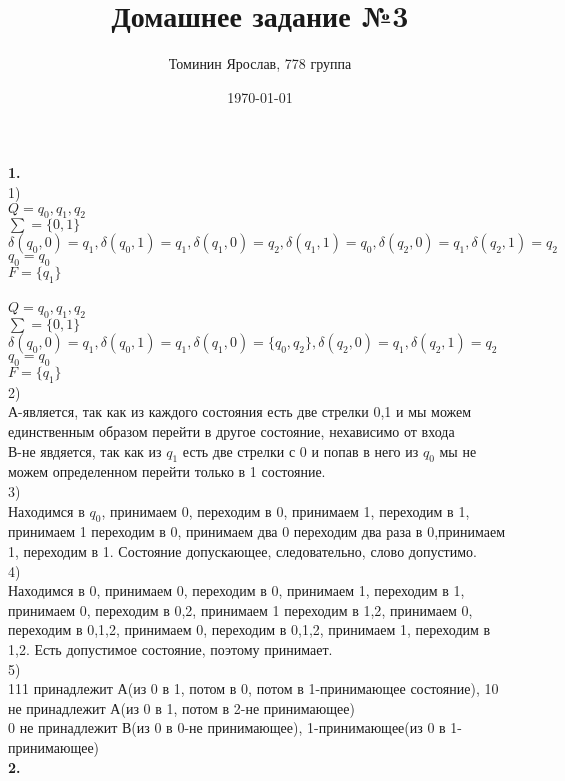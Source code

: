 \documentclass[a4paper,12pt]{article}
\author{Томинин Ярослав, 778 группа}
\title{Домашнее задание №3}
\date{\today}
\begin{document}
 

\maketitle
\newpage
\textbf{1.}\\
1)\\
$Q=q_0,q_1,q_2$\\
$\sum=\lbrace 0,1\rbrace$\\
$\delta(q_0,0)=q_1,\delta(q_0,1)=q_1,\delta(q_1,0)=q_2,\delta(q_1,1)=q_0,\delta(q_2,0)=q_1,\delta(q_2,1)=q_2$\\
$q_0=q_0$\\
$F=\lbrace q_1 \rbrace$\\
\\
$Q=q_0,q_1,q_2$\\
$\sum=\lbrace 0,1\rbrace$\\
$\delta(q_0,0)=q_1,\delta(q_0,1)=q_1,\delta(q_1,0)=\lbrace q_0,q_2 \rbrace ,\delta(q_2,0)=q_1,\delta(q_2,1)=q_2$\\
$q_0=q_0$\\
$F=\lbrace q_1 \rbrace$\\
2)\\
А-является, так как из каждого состояния есть две стрелки 0,1 и мы можем единственным образом перейти в другое состояние, нехависимо от входа\\
В-не явдяется, так как из $q_1$ есть две стрелки с 0 и попав в него из $q_0$ мы не можем определенном перейти только в 1 состояние.\\
3)\\
Находимся в $q_0$, принимаем 0, переходим в 0, принимаем 1, переходим в 1, принимаем 1 переходим в 0, принимаем два 0 переходим два раза в 0,принимаем 1, переходим в 1. Состояние допускающее, следовательно, слово допустимо.\\
4)\\
Находимся в 0, принимаем 0, переходим в 0, принимаем 1, переходим в 1, принимаем 0, переходим в {0,2}, принимаем 1 переходим в {1,2}, принимаем 0, переходим в {0,1,2}, принимаем 0, переходим в {0,1,2}, принимаем 1, переходим в {1,2}. Есть допустимое состояние, поэтому принимает.\\
5)\\
111 принадлежит А(из 0 в 1, потом в 0, потом в 1-принимающее состояние), 10 не принадлежит А(из 0 в 1, потом в 2-не принимающее)\\
0 не принадлежит В(из 0 в 0-не принимающее), 1-принимающее(из 0 в 1-принимающее)\\
\textbf{2.}\\
\end{document}

